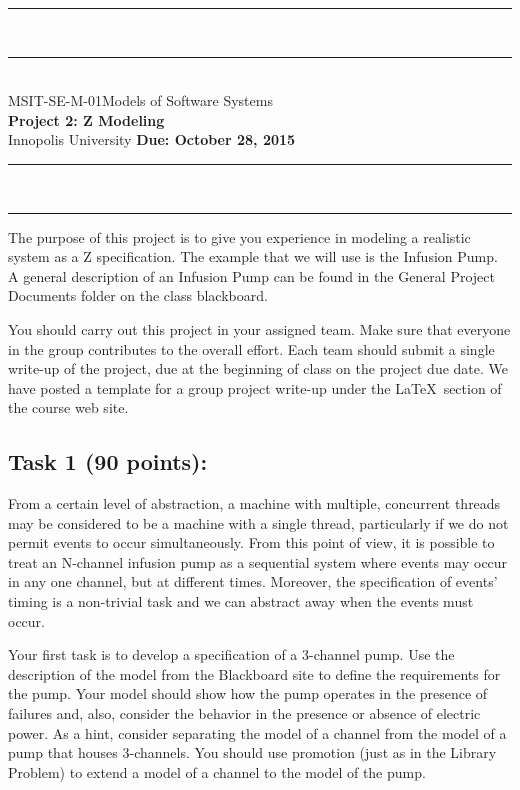 \documentclass{article}
\newcommand{\head}{\subsection*}
\begin{document}
\begin{center}
\rule{\textwidth}{1.5pt} \\ \rule[10pt]{\textwidth}{1pt}\\
MSIT-SE-M-01\hfill Models of Software Systems\\[3ex]
{\Large\bf Project 2: Z Modeling}\\[3ex]
Innopolis University \hfill {\bf Due: October 28, 2015} \rule{\textwidth}{1pt}
\\\rule[9.5pt]{\textwidth}{1.5pt}
\end{center}

The purpose of this project is to give you experience in modeling a
realistic system as a Z specification. The example that we will use
is the Infusion Pump. A general description of an Infusion Pump can
be found in the General Project Documents folder on the class
blackboard.

\bigskip You should carry out this project in your assigned team.
Make sure that everyone in the group contributes to the overall
effort. Each team should submit a single write-up of the project,
due at the beginning of class on the project due date. We have
posted a template for a group project write-up under the
\LaTeX~section of the course web site.

\head{Task 1 (90 points):}

From a certain level of abstraction, a machine with multiple,
concurrent threads may be considered to be a machine with a single
thread, particularly if we do not permit events to occur
simultaneously. From this point of view, it is possible to treat an
N-channel infusion pump as a sequential system where events may
occur in any one channel, but at different times. Moreover, the
specification of events' timing is a non-trivial task and we can
abstract away when the events must occur.

\bigskip Your first task is to develop a specification of a
3-channel pump. Use the description of the model from the Blackboard
site to define the requirements for the pump. Your model should show
how the pump operates  in the presence of failures and, also,
consider the behavior in the presence or absence of electric power.
As a hint, consider separating the model of a channel from the model
of a pump that houses 3-channels. You should use promotion (just as
in the Library Problem) to extend a model of a channel to the model
of the pump.
\end{document}

